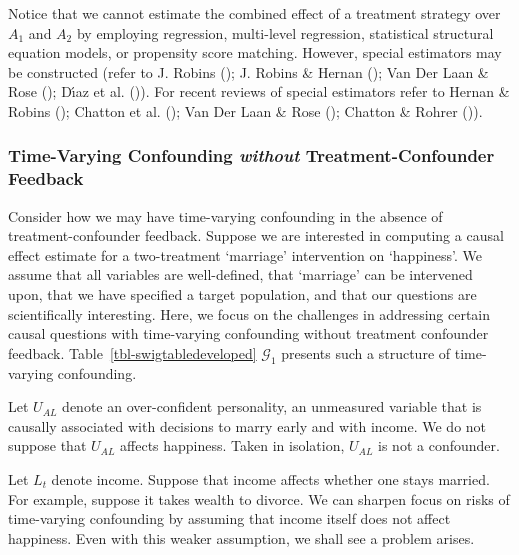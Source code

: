 \documentclass[
  single column]{article}
\begin{document}
Notice that we cannot estimate the combined effect of a treatment
strategy over \(A_1\) and \(A_2\) by employing regression, multi-level
regression, statistical structural equation models, or propensity score
matching. However, special estimators may be constructed (refer to J.
Robins (); J. Robins \& Hernan
(); Van Der Laan \& Rose
(); Dı́az et al.
()). For recent reviews of
special estimators refer to Hernan \& Robins
(); Chatton et al.
(); Van Der Laan \& Rose
(); Chatton \& Rohrer
()).

\subsubsection{\texorpdfstring{Time-Varying Confounding \emph{without}
Treatment-Confounder
Feedback}{Time-Varying Confounding without Treatment-Confounder Feedback}}\label{time-varying-confounding-without-treatment-confounder-feedback}

Consider how we may have time-varying confounding in the absence of
treatment-confounder feedback. Suppose we are interested in computing a
causal effect estimate for a two-treatment `marriage' intervention on
`happiness'. We assume that all variables are well-defined, that
`marriage' can be intervened upon, that we have specified a target
population, and that our questions are scientifically interesting. Here,
we focus on the challenges in addressing certain causal questions with
time-varying confounding without treatment confounder feedback.
Table~\ref{tbl-swigtabledeveloped} \(\mathcal{G}_1\) presents such a
structure of time-varying confounding.

Let \(U_{AL}\) denote an over-confident personality, an unmeasured
variable that is causally associated with decisions to marry early and
with income. We do not suppose that \(U_{AL}\) affects happiness. Taken
in isolation, \(U_{AL}\) is not a confounder.

Let \(L_t\) denote income. Suppose that income affects whether one stays
married. For example, suppose it takes wealth to divorce. We can sharpen
focus on risks of time-varying confounding by assuming that income
itself does not affect happiness. Even with this weaker assumption, we
shall see a problem arises.
\end{document}
